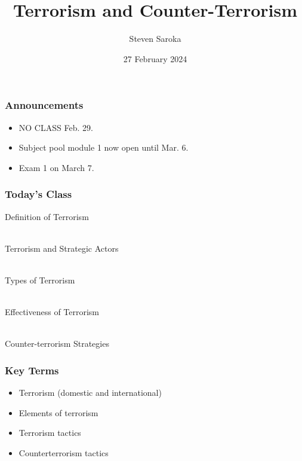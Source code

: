 \documentclass[handout]{beamer}
\title[Terrorism]{\LARGE{Terrorism and Counter-Terrorism}}
\author[POLI 150]{Steven Saroka}
\institute{POLI 150}
\date{27 February 2024}
\begin{document}
\begin{frame}
\titlepage %
\end{frame}




	\begin{frame} 
	\frametitle{\LARGE{Announcements}}
	\begin{itemize}
		\item NO CLASS Feb. 29.
		\item Subject pool module 1 now open until Mar. 6. 
		\item Exam 1 on March 7.
		
	\end{itemize}
\end{frame}

\begin{frame} 
\frametitle{\LARGE{Today's Class}}
	\begin{itemize}
		\Large{
			\item Definition of Terrorism
			\\~\\ 
			\item Terrorism and Strategic Actors
			\\~\\
			\item Types of Terrorism
			\\~\\
			\item Effectiveness of Terrorism
			\\~\\
			\item Counter-terrorism Strategies
		}
	\end{itemize}
\end{frame}

\begin{frame} 
	\frametitle{\LARGE{Key Terms}}
	\begin{itemize}
		\item Terrorism (domestic and international)
		\item Elements of terrorism
		\item Terrorism tactics
		\item Counterterrorism tactics
	\end{itemize}
\end{frame}
\end{document}
